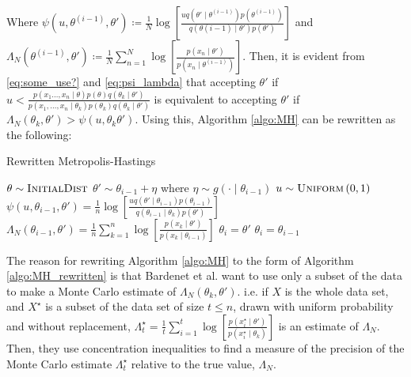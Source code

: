 Where $\psi\left(u, \theta^{(i-1)}, \theta'\right)\coloneqq \frac{1}{N}\log\left[\frac{u q\left(\theta'\mid\theta^{(i-1)}\right)p\left(\theta^{(i-1)}\right)}{q\left(\theta{(i-1)}\mid \theta'\right)p\left(\theta'\right)}\right]$ and $\Lambda_N\left(\theta^{(i-1)}, \theta'\right) \coloneqq \frac{1}{N}\sum_{n = 1}^N \log\left[\frac{p\left(x_n\mid \theta'\right)}{p\left(x_n\mid\theta^{(i-1)}\right)}\right]$. Then, it is evident from \eqref{eq:some_use?} and \eqref{eq:psi_lambda} that accepting $\theta'$ if $u < \frac{p\left(x_1\ldots, x_n\mid \theta\right)p\left(\theta\right)q\left(\theta_k\mid \theta'\right)}{p\left(x_1, \ldots, x_n\mid \theta_k\right)p\left(\theta_k\right)q\left(\theta_k\mid\theta'\right)}$ is equivalent to accepting $\theta'$ if $\Lambda_N\left(\theta_k, \theta'\right)>\psi\left(u,\theta_k\theta'\right)$. Using this, Algorithm \ref{algo:MH} can be rewritten as the following:
\begin{algorithm}[H] 
    \caption{Rewritten Metropolis-Hastings}
    \label{algo:MH_rewritten}
    \begin{algorithmic}[1] %
        \State $\theta \sim \textsc{InitialDist}$ 
        \State$\theta' \sim \theta_{i-1} + \eta$ where $\eta\sim g\left(\cdot \mid \theta_{i-1}\right)$
        \State $u\sim \textsc{Uniform}\left(0,1\right)$
        \State $\psi\left(u, \theta_{i-1}, \theta'\right) = \frac{1}{n} \log\left[\frac{u q\left(\theta'\mid \theta_{i-1} \right) p \left(\theta_{i-1}\right)}{q\left(\theta_{i-1} \mid \theta_k \right)p\left(\theta'\right)} \right]$
        \State $\Lambda_N \left(\theta_{i-1}, \theta'\right) = \frac{1}{n} \sum_{k = 1}^n \log \left[\frac{p\left(x_{k}\mid \theta'\right)}{p\left(x_{k}\mid \theta_{i-1}\right)}\right]$
        \State $\theta_i = \theta'$
        \Else 
        \State $\theta_i = \theta_{i-1}$
         \EndIf
         \EndFor
    \end{algorithmic}
\end{algorithm}
The reason for rewriting Algorithm \ref{algo:MH} to the form of Algorithm \ref{algo:MH_rewritten} is that Bardenet et al. want to use only a subset of the data to make a Monte Carlo estimate of $\Lambda_N\left(\theta_k, \theta'\right)$. 
i.e. if $X$ is the whole data set, and $X^{\star}$ is a subset of the data set of size $t\leq n$, drawn with uniform probability and without replacement, $\Lambda^{\star}_t = \frac{1}{t} \sum_{i = 1}^t \log\left[\frac{p\left(x_i^{\star}\mid \theta'\right)}{p\left(x_i^{\star}\mid \theta_k\right)}\right]$ is an estimate of $\Lambda_N$.  Then, they use concentration inequalities to find a measure of the precision of the Monte Carlo estimate $\Lambda_t^{\star}$ relative to the true value,  $\Lambda_N$.
